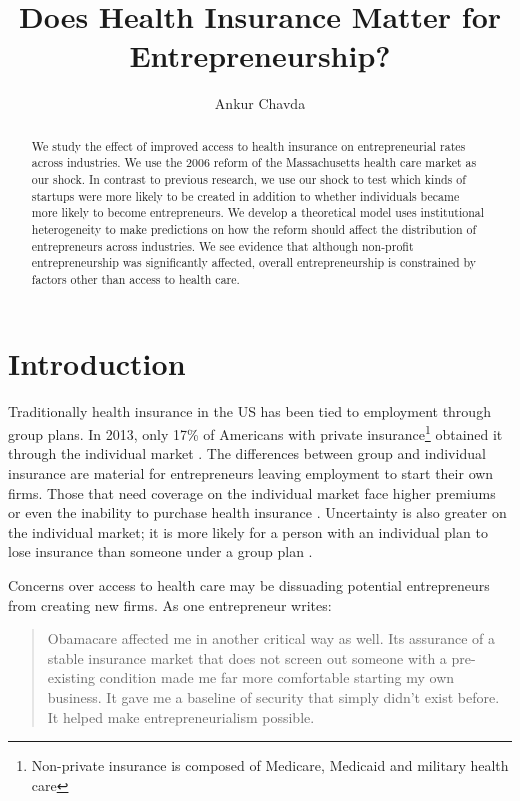\documentclass[12pt]{article}
\title{Does Health Insurance Matter for Entrepreneurship?}
\author{Ankur Chavda}
\begin{document}
\maketitle

\begin{abstract}
We study the effect of improved access to health insurance on entrepreneurial rates across industries. We use the 2006 reform of the Massachusetts health care market as our shock. In contrast to previous research, we use our shock to test which kinds of startups were more likely to be created in addition to whether individuals became more likely to become entrepreneurs.  We develop a theoretical model uses institutional heterogeneity to make predictions on how the reform should affect the distribution of entrepreneurs across industries. We see evidence that although non-profit entrepreneurship was significantly affected, overall entrepreneurship is constrained by factors other than access to health care. 
\end{abstract}


\section{Introduction}
Traditionally health insurance in the US has been tied to employment through group plans. In 2013, only 17\% of Americans with private insurance\footnote{Non-private insurance is composed of Medicare, Medicaid and military health care} obtained it through the individual market \cite{census}. The differences between group and individual insurance are material for entrepreneurs leaving employment to start their own firms. Those that need coverage on the individual market face higher premiums or even the inability to purchase health insurance \cite{kaiser}. Uncertainty is also greater on the individual market; it is more likely for a person with an individual plan to lose insurance than someone under a group plan \cite{pauly}. 

Concerns over access to health care may be dissuading potential entrepreneurs from creating new firms. As one entrepreneur writes:
\begin{quote}
Obamacare affected me in another critical way as well. Its assurance of a stable insurance market that does not screen out someone with a pre-existing condition made me far more comfortable starting my own business. It gave me a baseline of security that simply didn't exist before. It helped make entrepreneurialism possible. \cite{sullivan}
\end{quote}
\end{document}
